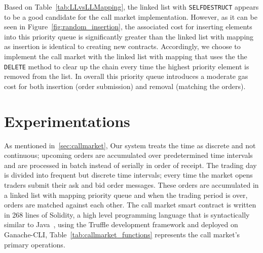 Based on Table~\ref{tab:LLvsLLMapping}, the linked list with \texttt{SELFDESTRUCT} appears to be a good candidate for the call market implementation. However, as it can be seen in Figure~\ref{fig:random_insertion}, the associated cost for inserting elements into this priority queue is significantly greater than the linked list with mapping as insertion is identical to creating new contracts. Accordingly, we choose to implement the call market with the linked list with mapping that uses the  the \texttt{DELETE} method to clear up the chain every time the highest priority element is removed from the list. In overall this priority queue introduces a moderate gas cost for both insertion (\ie order submission) and removal (\ie matching the orders). 




\section{Experimentations}
 
As mentioned in~\ref{sec:callmarket}, Our system treats the time as discrete and not continuous; upcoming orders are accumulated over predetermined time intervals and are processed in batch instead of serially in order of receipt. The trading day is divided into frequent but discrete time intervals; every time the market opens traders submit their ask and bid order messages. These orders are accumulated in a linked list with mapping priority queue and when the trading period is over, orders are matched against each other. The call market smart contract is written in 268 lines of Solidity, a high level programming language that is syntactically similar to Java~\cite{Ethereum41:online}, using the Truffle development framework and deployed on Ganache-CLI, Table~\ref{tab:callmarket_functions} represents the call market's primary operations.

